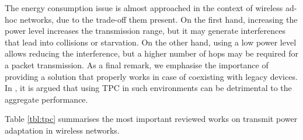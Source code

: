 \documentclass[12pt, a4paper,twoside]{tesi_upf}
\begin{document}
				The energy consumption issue is almost approached in the context of wireless ad-hoc networks, due to the trade-off them present. On the first hand, increasing the power level increases the transmission range, but it may generate interferences that lead into collisions or starvation. On the other hand, using a low power level allows reducing the interference, but a higher number of hops may be required for a packet transmission. As a final remark, we emphasise the importance of providing a solution that properly works in case of coexisting with legacy devices. In \cite{broustis2010measurement}, it is argued that using TPC in such environments can be detrimental to the aggregate performance.
			
				Table \ref{tbl:tpc} summarises the most important reviewed works on transmit power adaptation in wireless networks.
\end{document}
